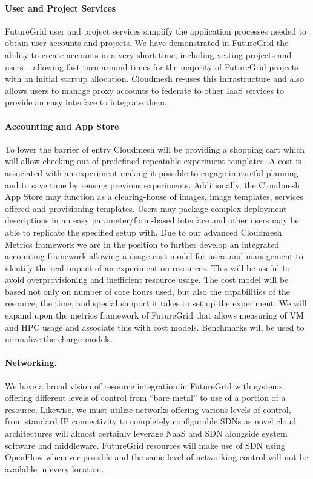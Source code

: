 \documentclass{article}
\begin{document}
\paragraph{User and Project Services}

FutureGrid user and project services simplify the application processes needed to obtain user accounts and projects. We have demonstrated in FutureGrid the ability to create accounts in a very short time, including vetting projects and users – allowing fast turn-around times for the majority of FutureGrid projects with an initial startup allocation. Cloudmesh re-uses this infrastructure and also allows users to manage proxy accounts to federate to other IaaS services to provide an easy interface to integrate them.

\paragraph{Accounting and App Store}

To lower the barrier of entry Cloudmesh will be providing a shopping cart which will allow checking out of predefined repeatable experiment templates. A cost is associated with an experiment making it possible to engage in careful planning and to save time by reusing previous experiments. Additionally, the Cloudmesh App Store may function as a clearing-house of images, image templates, services offered and provisioning templates. Users may package complex deployment descriptions in an easy parameter/form-based interface and other users may be able to replicate the specified setup with.
Due to our advanced Cloudmesh Metrics framework we are in the position to further develop an integrated accounting framework allowing a usage cost model for users and management to identify the real impact of an experiment on resources. This will be useful to avoid overprovisioning and inefficient resource usage. The cost model will be based not only on number of core hours used, but also the capabilities of the resource, the time, and special support it takes to set up the experiment. We will expand upon the metrics framework of FutureGrid that allows measuring of VM and HPC usage and associate this with cost models. Benchmarks will be used to normalize the charge models.

\paragraph{Networking.}

We have a broad vision of resource integration in FutureGrid with systems offering different levels of control from “bare metal” to use of a portion of a resource. Likewise, we must utilize networks offering various levels of control, from standard IP connectivity to completely configurable SDNs as novel cloud architectures will almost certainly leverage NaaS and SDN alongside system software and middleware. FutureGrid resources will make use of SDN using OpenFlow whenever possible and the same level of networking control will not be available in every location.
\end{document}

